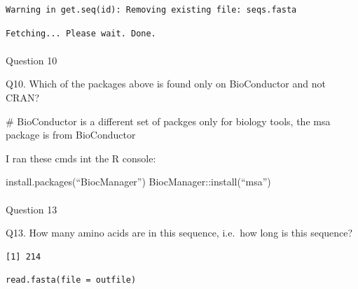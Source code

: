 \documentclass[
  letterpaper,
  DIV=11,
  numbers=noendperiod]{scrartcl}
\makeatletter
\let\oldparagraph\paragraph
\renewcommand{\paragraph}{
    \@ifstar
      \xxxParagraphStar
      \xxxParagraphNoStar
  }
\newcommand{\xxxParagraphStar}[1]{\oldparagraph*{#1}\mbox{}}
\newcommand{\xxxParagraphNoStar}[1]{\oldparagraph{#1}\mbox{}}
\newenvironment{Shaded}{\begin{snugshade}}{\end{snugshade}}
\newcommand{\CommentTok}[1]{\textcolor[rgb]{0.37,0.37,0.37}{#1}}
\newcommand{\FunctionTok}[1]{\textcolor[rgb]{0.28,0.35,0.67}{#1}}
\newcommand{\NormalTok}[1]{\textcolor[rgb]{0.00,0.23,0.31}{#1}}
\newcommand{\SpecialCharTok}[1]{\textcolor[rgb]{0.37,0.37,0.37}{#1}}
\makeatother
\begin{document}
\begin{verbatim}
Warning in get.seq(id): Removing existing file: seqs.fasta
\end{verbatim}

\begin{verbatim}
Fetching... Please wait. Done.
\end{verbatim}

\paragraph{Question 10}\label{question-10}

Q10. Which of the packages above is found only on BioConductor and not
CRAN?

\begin{Shaded}
\begin{Highlighting}[]
\CommentTok{\# BioConductor is a different set of packges only for biology tools, the \textquotesingle{}msa\textquotesingle{} package is from BioConductor}
\end{Highlighting}
\end{Shaded}

I ran these cmds int the R console:

install.packages(``BiocManager'') BiocManager::install(``msa'')

\paragraph{Question 13}\label{question-13}

Q13. How many amino acids are in this sequence, i.e.~how long is this
sequence?

\begin{Shaded}
\end{Shaded}

\begin{verbatim}
[1] 214
\end{verbatim}

\begin{Shaded}
\end{Shaded}

\begin{verbatim}
read.fasta(file = outfile)
\end{verbatim}
\end{document}
